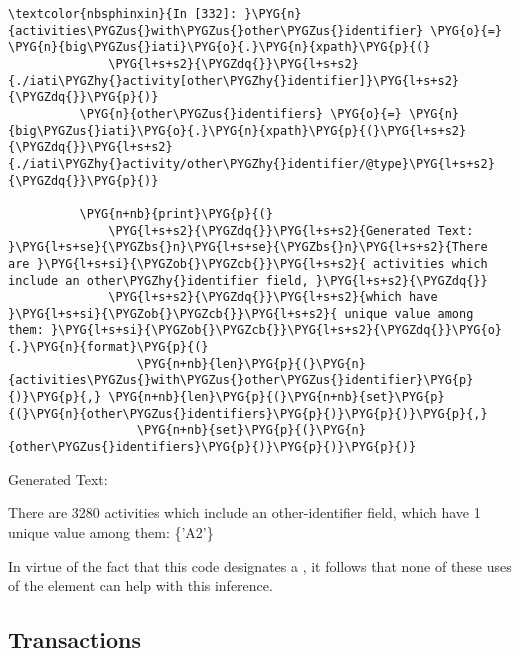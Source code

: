 \documentclass[letterpaper,10pt,english]{sphinxmanual}
\begin{document}
\begin{Verbatim}[commandchars=\\\{\}]
\textcolor{nbsphinxin}{In [332]: }\PYG{n}{activities\PYGZus{}with\PYGZus{}other\PYGZus{}identifier} \PYG{o}{=} \PYG{n}{big\PYGZus{}iati}\PYG{o}{.}\PYG{n}{xpath}\PYG{p}{(}
              \PYG{l+s+s2}{\PYGZdq{}}\PYG{l+s+s2}{./iati\PYGZhy{}activity[other\PYGZhy{}identifier]}\PYG{l+s+s2}{\PYGZdq{}}\PYG{p}{)}
          \PYG{n}{other\PYGZus{}identifiers} \PYG{o}{=} \PYG{n}{big\PYGZus{}iati}\PYG{o}{.}\PYG{n}{xpath}\PYG{p}{(}\PYG{l+s+s2}{\PYGZdq{}}\PYG{l+s+s2}{./iati\PYGZhy{}activity/other\PYGZhy{}identifier/@type}\PYG{l+s+s2}{\PYGZdq{}}\PYG{p}{)}
          
          \PYG{n+nb}{print}\PYG{p}{(}
              \PYG{l+s+s2}{\PYGZdq{}}\PYG{l+s+s2}{Generated Text: }\PYG{l+s+se}{\PYGZbs{}n}\PYG{l+s+se}{\PYGZbs{}n}\PYG{l+s+s2}{There are }\PYG{l+s+si}{\PYGZob{}\PYGZcb{}}\PYG{l+s+s2}{ activities which include an other\PYGZhy{}identifier field, }\PYG{l+s+s2}{\PYGZdq{}}
              \PYG{l+s+s2}{\PYGZdq{}}\PYG{l+s+s2}{which have }\PYG{l+s+si}{\PYGZob{}\PYGZcb{}}\PYG{l+s+s2}{ unique value among them: }\PYG{l+s+si}{\PYGZob{}\PYGZcb{}}\PYG{l+s+s2}{\PYGZdq{}}\PYG{o}{.}\PYG{n}{format}\PYG{p}{(}
                  \PYG{n+nb}{len}\PYG{p}{(}\PYG{n}{activities\PYGZus{}with\PYGZus{}other\PYGZus{}identifier}\PYG{p}{)}\PYG{p}{,} \PYG{n+nb}{len}\PYG{p}{(}\PYG{n+nb}{set}\PYG{p}{(}\PYG{n}{other\PYGZus{}identifiers}\PYG{p}{)}\PYG{p}{)}\PYG{p}{,}
                  \PYG{n+nb}{set}\PYG{p}{(}\PYG{n}{other\PYGZus{}identifiers}\PYG{p}{)}\PYG{p}{)}\PYG{p}{)}
\end{Verbatim}
%
\begin{OriginalVerbatim}[commandchars=\\\{\}]
Generated Text:

There are 3280 activities which include an other-identifier field, which have 1 unique value among them: \{'A2'\}
\end{OriginalVerbatim}
\relax
In virtue of the fact that this code designates a ,
it follows that none of these uses of the  element
can help with this inference.


\subsection{Transactions}
\label{\detokenize{Global Affairs Canada - Compliance Report:Transactions}}
\end{document}
